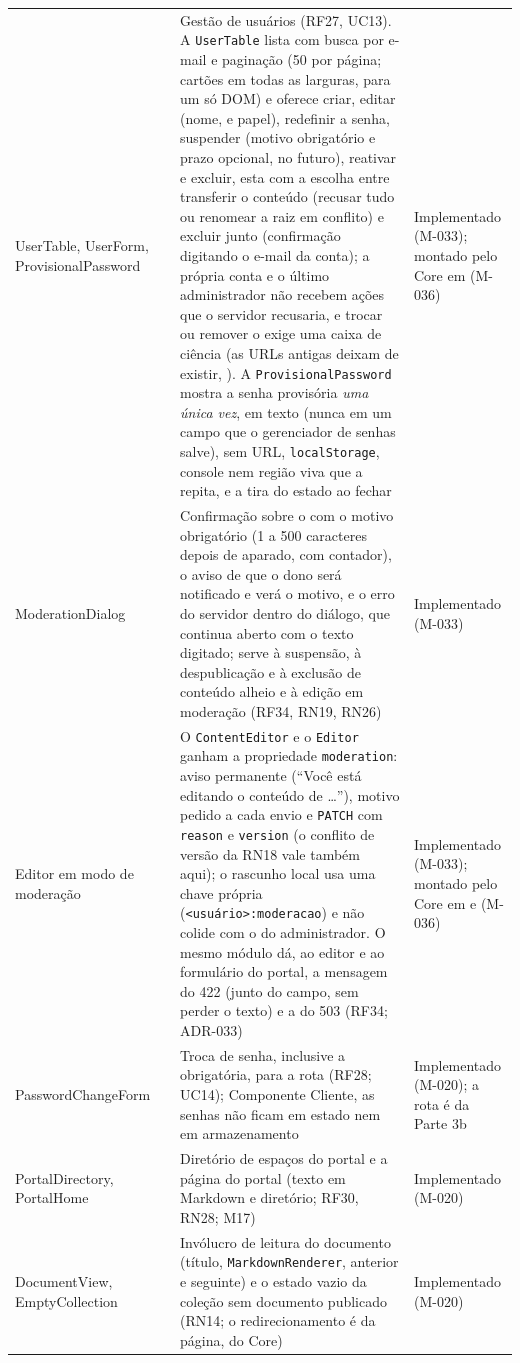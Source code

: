\begin{longtable}{@{}L{3.3cm}L{2.9cm}L{6.0cm}L{2.2cm}@{}}
UserTable, UserForm, ProvisionalPassword &  & Gestão de usuários (RF27, UC13). A \texttt{UserTable} lista com busca por e-mail e paginação (50 por página; cartões em todas as larguras, para um só DOM) e oferece criar, editar (nome,  e papel), redefinir a senha, suspender (motivo obrigatório e prazo opcional, no futuro), reativar e excluir, esta com a escolha entre transferir o conteúdo (recusar tudo ou renomear a raiz em conflito) e excluir junto (confirmação digitando o e-mail da conta); a própria conta e o último administrador não recebem ações que o servidor recusaria, e trocar ou remover o  exige uma caixa de ciência (as URLs antigas deixam de existir, ). A \texttt{ProvisionalPassword} mostra a senha provisória \emph{uma única vez}, em texto (nunca em um campo que o gerenciador de senhas salve), sem URL, \texttt{localStorage}, console nem região viva que a repita, e a tira do estado ao fechar & Implementado (M-033); montado pelo Core em  (M-036)\\
ModerationDialog &  & Confirmação sobre o  com o motivo obrigatório (1 a 500 caracteres depois de aparado, com contador), o aviso de que o dono será notificado e verá o motivo, e o erro do servidor dentro do diálogo, que continua aberto com o texto digitado; serve à suspensão, à despublicação e à exclusão de conteúdo alheio e à edição em moderação (RF34, RN19, RN26) & Implementado (M-033)\\
Editor em modo de moderação &  & O \texttt{ContentEditor} e o \texttt{Editor} ganham a propriedade \texttt{moderation}: aviso permanente (``Você está editando o conteúdo de \ldots''), motivo pedido a cada envio e \texttt{PATCH} com \texttt{reason} e \texttt{version} (o conflito de versão da RN18 vale também aqui); o rascunho local usa uma chave própria (\texttt{<usuário>:moderacao}) e não colide com o do administrador. O mesmo módulo  dá, ao editor e ao formulário do portal, a mensagem do 422  (junto do campo, sem perder o texto) e a do 503  (RF34; ADR-033) & Implementado (M-033); montado pelo Core em  e  (M-036)\\
PasswordChangeForm &  & Troca de senha, inclusive a obrigatória, para a rota  (RF28; UC14); Componente Cliente, as senhas não ficam em estado nem em armazenamento & Implementado (M-020); a rota é da Parte 3b\\
PortalDirectory, PortalHome &  & Diretório de espaços do portal e a página do portal (texto em Markdown e diretório; RF30, RN28; M17) & Implementado (M-020)\\
DocumentView, EmptyCollection &  & Invólucro de leitura do documento (título, \texttt{MarkdownRenderer}, anterior e seguinte) e o estado vazio da coleção sem documento publicado (RN14; o redirecionamento é da página, do Core) & Implementado (M-020)\\
\end{longtable}
